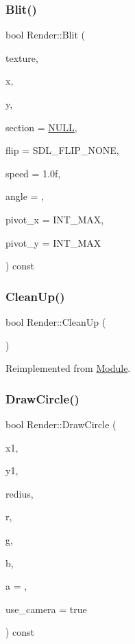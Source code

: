\subsubsection{\texorpdfstring{Blit()}{Blit()}}
{\footnotesize\ttfamily bool Render\+::\+Blit (\begin{DoxyParamCaption}\item[{S\+D\+L\+\_\+\+Texture $\ast$}]{texture,  }\item[{int}]{x,  }\item[{int}]{y,  }\item[{const S\+D\+L\+\_\+\+Rect $\ast$}]{section = {\ttfamily \mbox{\hyperlink{_defs_8h_a070d2ce7b6bb7e5c05602aa8c308d0c4}{N\+U\+LL}}},  }\item[{S\+D\+L\+\_\+\+Renderer\+Flip}]{flip = {\ttfamily SDL\+\_\+FLIP\+\_\+NONE},  }\item[{float}]{speed = {\ttfamily 1.0f},  }\item[{double}]{angle = {},  }\item[{int}]{pivot\+\_\+x = {\ttfamily INT\+\_\+MAX},  }\item[{int}]{pivot\+\_\+y = {\ttfamily INT\+\_\+MAX} }\end{DoxyParamCaption}) const}

\mbox{\label{class_render_a96a6770025fabf47750ef73600b3d58e}} 
\subsubsection{\texorpdfstring{CleanUp()}{CleanUp()}}
{\footnotesize\ttfamily bool Render\+::\+Clean\+Up (\begin{DoxyParamCaption}{ }\end{DoxyParamCaption})\hspace{0.3cm}{\ttfamily [virtual]}}



Reimplemented from \mbox{\hyperlink{class_module_a77d7a006e42c0bd10110e1adbd4598cb}{Module}}.

\mbox{\label{class_render_aa13a90ad9a8cda26ffad5bd0f9a5f2d4}} 
\subsubsection{\texorpdfstring{DrawCircle()}{DrawCircle()}}
{\footnotesize\ttfamily bool Render\+::\+Draw\+Circle (\begin{DoxyParamCaption}\item[{int}]{x1,  }\item[{int}]{y1,  }\item[{int}]{redius,  }\item[{Uint8}]{r,  }\item[{Uint8}]{g,  }\item[{Uint8}]{b,  }\item[{Uint8}]{a = {},  }\item[{bool}]{use\+\_\+camera = {\ttfamily true} }\end{DoxyParamCaption}) const}

